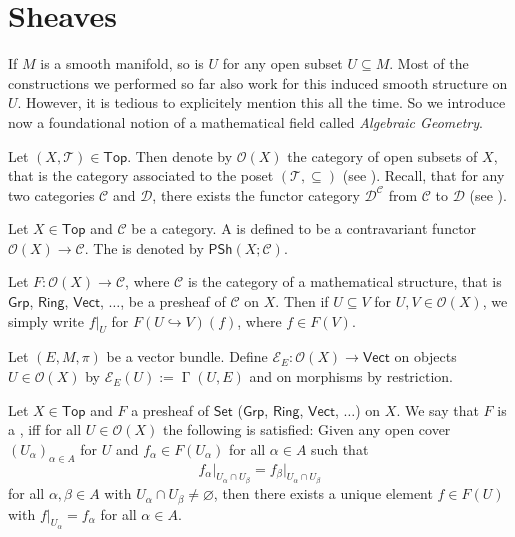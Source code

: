 \section*{Sheaves}
If $M$ is a smooth manifold, so is $U$ for any open subset $U \subseteq M$. Most of the constructions we performed so far also work for this induced smooth structure on $U$. However, it is tedious to explicitely mention this all the time. So we introduce now a foundational notion of a mathematical field called \emph{Algebraic Geometry}.

Let $(X,\mathcal{T}) \in \mathsf{Top}$. Then denote by $\mathcal{O}(X)$ the category of open subsets of $X$, that is the category associated to the poset $(\mathcal{T},\subseteq)$ (see \cite[24]{leinster:basic_category:2016}). Recall, that for any two categories $\mathcal{C}$ and $\mathcal{D}$, there exists the functor category $\mathcal{D}^\mathcal{C}$ from $\mathcal{C}$ to $\mathcal{D}$ (see \cite[30]{leinster:basic_category:2016}).

\begin{definition}[Presheaf]
	Let $X \in \mathsf{Top}$ and $\mathcal{C}$ be a category. A  is defined to be a contravariant functor $\mathcal{O}(X) \to \mathcal{C}$. The  is denoted by $\mathsf{PSh}(X;\mathcal{C})$.
\end{definition}

\begin{remark}
	Let $F : \mathcal{O}(X) \to \mathcal{C}$, where $\mathcal{C}$ is the category of a mathematical structure, that is $\mathsf{Grp}$, $\mathsf{Ring}$, $\mathsf{Vect}$, $\dots$, be a presheaf of $\mathcal{C}$ on $X$. Then if $U \subseteq V$ for $U,V \in \mathcal{O}(X)$, we simply write $f\vert_U$ for $F(U \hookrightarrow V)(f)$, where $f \in F(V)$. 
\end{remark}

\begin{example}
	\label{ex:vector_bundle_presheaf}
	Let $(E,M,\pi)$ be a vector bundle. Define $\mathcal{E}_E : \mathcal{O}(X) \to \mathsf{Vect}$ on objects $U \in \mathcal{O}(X)$ by $\mathcal{E}_E(U) := \upGamma(U,E)$ and on morphisms by restriction.	
\end{example}

\begin{definition}[Sheaf]
	Let $X \in \mathsf{Top}$ and $F$ a presheaf of $\mathsf{Set}$ \textup{(}$\mathsf{Grp}$, $\mathsf{Ring}$, $\mathsf{Vect}$, $\dots$\textup{)} on $X$. We say that $F$ is a , iff for all $U \in \mathcal{O}(X)$ the following  is satisfied: Given any open cover $(U_\alpha)_{\alpha \in A}$ for $U$ and $f_\alpha \in F(U_\alpha)$ for all $\alpha \in A$ such that
	\begin{equation*}
		f_\alpha\vert_{U_\alpha \cap U_\beta} = f_\beta\vert_{U_\alpha \cap U_\beta}
	\end{equation*}
	\noindent for all $\alpha,\beta \in A$ with $U_\alpha \cap U_\beta \neq \varnothing$, then there exists a unique element $f \in F(U)$ with $f\vert_{U_\alpha} = f_\alpha$ for all $\alpha \in A$.
\end{definition}

